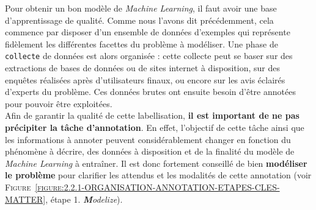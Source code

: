 			Pour obtenir un bon modèle de \textit{Machine Learning}, il faut avoir une base d’apprentissage de qualité.
			Comme nous l'avons dit précédemment, cela commence par disposer d'un ensemble de données d'exemples qui représente fidèlement les différentes facettes du problème à modéliser.
			Une phase de \texttt{collecte} de données est alors organisée : cette collecte peut se baser sur des extractions de bases de données ou de sites internet à disposition, sur des enquêtes réalisées après d'utilisateurs finaux, ou encore sur les avis éclairés d'experts du problème.
			Ces données brutes ont ensuite besoin d'être annotées pour pouvoir être exploitées. \\
			
			
			Afin de garantir la qualité de cette labellisation, \textbf{il est important de ne pas précipiter la tâche d'annotation}.
			En effet, l'objectif de cette tâche ainsi que les informations à annoter peuvent considérablement changer en fonction du phénomène à décrire, des données à disposition et de la finalité du modèle de \textit{Machine Learning} à entraîner.
			Il est donc fortement conseillé de bien \textbf{modéliser le problème} pour clarifier les attendus et les modalités de cette annotation (voir \textsc{Figure~\ref{figure:2.2.1-ORGANISATION-ANNOTATION-ETAPES-CLES-MATTER}}, étape 1. \textit{\textbf{M}odelize}).
			
